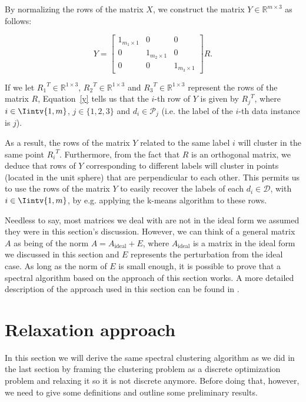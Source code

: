 By normalizing the rows of the matrix $X$, we construct the matrix $Y \in \mathbb{R}^{m \times 3}$ as follows:

\begin{equation}\label{y}
   Y = 
   \begin{bmatrix}
      1_{m_1 \times 1} & 0 & 0 \\
      0 & 1_{m_2 \times 1} & 0 \\
      0 & 0 & 1_{m_3 \times 1} 
   \end{bmatrix}R.
\end{equation}

If we let ${R_1}^T \in \mathbb{R}^{1 \times 3}$, ${R_2}^T \in \mathbb{R}^{1 \times 3}$ and ${R_3}^T \in \mathbb{R}^{1 \times 3}$ represent the rows of the matrix $R$, Equation~\vref{y} tells us that the $i$-th row of $Y$ is given by ${R_j} ^T$, where $i \in \Iintv{1,m}$, $j \in \{1, 2, 3 \}$ and $d_i \in \mathcal P_j$ (i.e. the label of the $i$-th data instance is $j$).

As a result, the rows of the matrix $Y$ related to the same label $i$ will cluster in the same point ${R_i}^T$.
Furthermore, from the fact that $R$ is an orthogonal matrix, we deduce that rows of $Y$ corresponding to different labels will cluster in points (located in the unit sphere) that are perpendicular to each other. 
This permits us to use the rows of the matrix $Y$ to easily recover the labels of each $d_i \in \mathcal D$, with $i \in \Iintv{1,m}$, by e.g. applying the k-means algorithm to these rows.

Needless to say, most matrices we deal with are not in the ideal form we assumed they were in this section's discussion.
However, we can think of a general matrix $A$ as being of the norm $A = A_{\text{ideal}} + E$, where $A_{\text{ideal}}$ is a matrix in the ideal form we discussed in this section and $E$ represents the perturbation from the ideal case.
As long as the norm of $E$ is small enough, it is possible to prove that a spectral algorithm based on the approach of this section works.
A more detailed description of the approach used in this section can be found in \cite{ng}.


\section{Relaxation approach}
In this section we will derive the same spectral clustering algorithm as we did in the last section by framing the clustering problem as a discrete optimization problem and relaxing it so it is not discrete anymore.
Before doing that, however, we need to give some definitions and outline some preliminary results.

